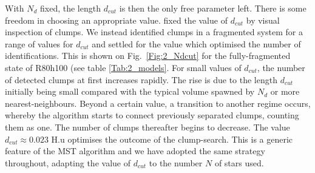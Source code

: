 With $N_d$ fixed, the length $d_{cut}$ is then the only free parameter left. There is some freedom 
in choosing an appropriate value. \cite{Maschberger2010} fixed the value of  $d_{cut}$ by visual inspection of clumps.  We instead  identified  clumps in a fragmented system for a range of values for $d_{cut}$ and settled for the value  which optimised the number of identifications. This is shown on Fig.~\ref{Fig:2_Ndcut} for the fully-fragmented state of R80h100 (see table \ref{Tab:2_models}. For small values of $d_{cut}$, the number of detected clumps at first  increases rapidly. The rise is due  to the length $d_{cut}$ initially being small compared with the typical volume spawned by $N_d$ or more  nearest-neighbours. Beyond a certain value, a transition to another regime occurs, whereby the algorithm starts to connect previously separated clumps, counting them as one. The number of clumps thereafter begins to decrease. The value $d_{cut} \approx 0.023$ H.u optimises the outcome of the clump-search. This is a generic feature of the MST algorithm and we have adopted the same strategy throughout, adapting the value of $d_{cut}$ to the number $N$ of stars used. 


